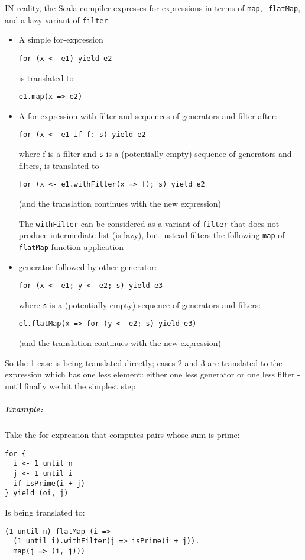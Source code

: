 \documentclass{scrartcl}
\newcommand{\example}{\subparagraph{Example:}} %
\begin{document}
IN reality, the Scala compiler expresses for-expressions in terms of
\lstinline|map, flatMap|, and a lazy variant of \lstinline|filter|:
\begin{itemize}
\item A simple for-expression
\begin{lstlisting}
for (x <- e1) yield e2
\end{lstlisting}
is translated to 
\begin{lstlisting}
e1.map(x => e2)
\end{lstlisting}
\item A for-expression with filter and sequences of generators and filter after:
\begin{lstlisting}
for (x <- e1 if f: s) yield e2
\end{lstlisting}
  where f is a filter and \lstinline|s| is a (potentially empty) sequence of
  generators and filters, is translated to 
\begin{lstlisting}
for (x <- e1.withFilter(x => f); s) yield e2
\end{lstlisting}
(and the translation continues with the new expression)

The \lstinline|withFilter| can be considered as a variant of \lstinline|filter|
that does not produce intermediate list (is lazy), but instead filters the following
\lstinline|map| of \lstinline|flatMap| function application

\item generator followed by other generator:
\begin{lstlisting}
for (x <- e1; y <- e2; s) yield e3
\end{lstlisting}
where \lstinline|s| is a (potentially empty) sequence of generators and filters: 
\begin{lstlisting}
el.flatMap(x => for (y <- e2; s) yield e3)
\end{lstlisting}
(and the translation continues with the new expression)
\end{itemize}
So the 1 case is being translated directly; cases 2 and 3 are translated to the
expression which has one less element: either one less generator or one less
filter - until finally we hit the simplest step.

\example Take the for-expression that computes pairs whose sum is prime:
\begin{lstlisting}
for {
  i <- 1 until n
  j <- 1 until i
  if isPrime(i + j)
} yield (oi, j)
\end{lstlisting}
Is being translated to:
\begin{lstlisting}
(1 until n) flatMap (i =>
  (1 until i).withFilter(j => isPrime(i + j)).
  map(j => (i, j)))
\end{lstlisting}
\end{document}
